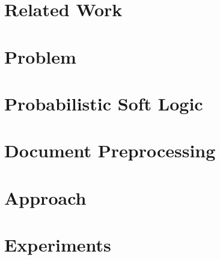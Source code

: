 \documentclass{sig-alternate}
\begin{document}
\section{Related Work}


\section{Problem}


\section{Probabilistic Soft Logic}

\label{section:PSL}


\section{Document Preprocessing}


\section{Approach}


\section{Experiments}



\end{document}
